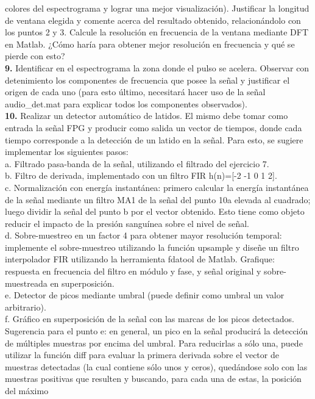colores del espectrograma y lograr una mejor visualización). Justificar la longitud de
ventana elegida y comente acerca del resultado obtenido, relacionándolo con los
puntos 2 y 3. Calcule la resolución en frecuencia de la ventana mediante DFT en
Matlab. ¿Cómo haría para obtener mejor resolución en frecuencia y qué se pierde con
esto?\\
\textbf{9.} Identificar en el espectrograma la zona donde el pulso se acelera. Observar con
detenimiento los componentes de frecuencia que posee la señal y justificar el origen
de cada uno (para esto último, necesitará hacer uso de la señal audio_det.mat
para explicar todos los componentes observados).\\
\textbf{10.} Realizar un detector automático de latidos. El mismo debe tomar como entrada la
señal FPG y producir como salida un vector de tiempos, donde cada tiempo
corresponde a la detección de un latido en la señal. Para esto, se sugiere implementar
los siguientes pasos:\\
a. Filtrado pasa-banda de la señal, utilizando el filtrado del ejercicio 7.\\
b. Filtro de derivada, implementado con un filtro FIR h(n)=[-2 -1 0 1 2].\\
c. Normalización con energía instantánea: primero calcular la energía
instantánea de la señal mediante un filtro MA1 de la señal del punto 10a
elevada al cuadrado; luego dividir la señal del punto b por el vector obtenido.
Esto tiene como objeto reducir el impacto de la presión sanguínea sobre el
nivel de señal.\\
d. Sobre-muestreo en un factor 4 para obtener mayor resolución temporal:
implemente el sobre-muestreo utilizando la función upsample y diseñe un
filtro interpolador FIR utilizando la herramienta fdatool de Matlab.
Grafique: respuesta en frecuencia del filtro en módulo y fase, y señal original
y sobre-muestreada en superposición.\\
e. Detector de picos mediante umbral (puede definir como umbral un valor
arbitrario).\\
f. Gráfico en superposición de la señal con las marcas de los picos detectados.
Sugerencia para el punto e: en general, un pico en la señal producirá la detección de
múltiples muestras por encima del umbral. Para reducirlas a sólo una, puede utilizar
la función diff para evaluar la primera derivada sobre el vector de muestras
detectadas (la cual contiene sólo unos y ceros), quedándose solo con las muestras
positivas que resulten y buscando, para cada una de estas, la posición del máximo
